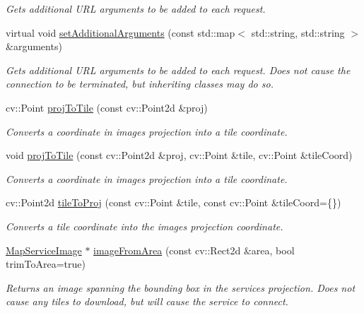 \begin{DoxyCompactItemize}
\begin{DoxyCompactList}\small\item\em Gets additional U\+RL arguments to be added to each request. \end{DoxyCompactList}\item 
virtual void \hyperlink{group___imagery_module_gac4ab75cb614415087330a2bc36b3a8d7}{set\+Additional\+Arguments} (const std\+::map$<$ std\+::string, std\+::string $>$ \&arguments)
\begin{DoxyCompactList}\small\item\em Gets additional U\+RL arguments to be added to each request. Does not cause the connection to be terminated, but inheriting classes may do so. \end{DoxyCompactList}\item 
cv\+::\+Point \hyperlink{group___imagery_module_gadac27fac13942e9aa0717191107da278}{proj\+To\+Tile} (const cv\+::\+Point2d \&proj)
\begin{DoxyCompactList}\small\item\em Converts a coordinate in image\textquotesingle{}s projection into a tile coordinate. \end{DoxyCompactList}\item 
void \hyperlink{group___imagery_module_gafc62330e9990a5048dd7ce44cdfb489d}{proj\+To\+Tile} (const cv\+::\+Point2d \&proj, cv\+::\+Point \&tile, cv\+::\+Point \&tile\+Coord)
\begin{DoxyCompactList}\small\item\em Converts a coordinate in image\textquotesingle{}s projection into a tile coordinate. \end{DoxyCompactList}\item 
cv\+::\+Point2d \hyperlink{group___imagery_module_ga16bfe2b02badb978b9faf6efc4e630ff}{tile\+To\+Proj} (const cv\+::\+Point \&tile, const cv\+::\+Point \&tile\+Coord=\{\})
\begin{DoxyCompactList}\small\item\em Converts a tile coordinate into the image\textquotesingle{}s projection coordinate. \end{DoxyCompactList}\item 
\hyperlink{classdg_1_1deepcore_1_1imagery_1_1_map_service_image}{Map\+Service\+Image} $\ast$ \hyperlink{group___imagery_module_ga3526b9184dbdbe4402c0a3f73c2daeae}{image\+From\+Area} (const cv\+::\+Rect2d \&area, bool trim\+To\+Area=true)
\begin{DoxyCompactList}\small\item\em Returns an image spanning the bounding box in the service\textquotesingle{}s projection. Does not cause any tiles to download, but will cause the service to connect. \end{DoxyCompactList}\item 

\end{DoxyCompactItemize}
